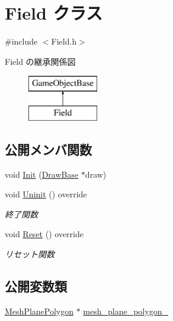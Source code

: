 \hypertarget{class_field}{}\section{Field クラス}
\label{class_field}


{\ttfamily \#include $<$Field.\+h$>$}

Field の継承関係図\begin{figure}[H]
\begin{center}
\leavevmode
\includegraphics[height=2.000000cm]{class_field}
\end{center}
\end{figure}
\subsection*{公開メンバ関数}
\begin{DoxyCompactItemize}
\item 
void \mbox{\hyperlink{class_field_a8360ab68eaf346984eab8bce4c37c3b3}{Init}} (\mbox{\hyperlink{class_draw_base}{Draw\+Base}} $\ast$draw)
\item 
void \mbox{\hyperlink{class_field_a6d1015e2409daa87cd00485ac1efc06b}{Uninit}} () override
\begin{DoxyCompactList}\small\item\em 終了関数 \end{DoxyCompactList}\item 
void \mbox{\hyperlink{class_field_a5b140074dcca821ac702da348238c6d4}{Reset}} () override
\begin{DoxyCompactList}\small\item\em リセット関数 \end{DoxyCompactList}\end{DoxyCompactItemize}
\subsection*{公開変数類}
\begin{DoxyCompactItemize}
\item 
\mbox{\hyperlink{class_mesh_plane_polygon}{Mesh\+Plane\+Polygon}} $\ast$ \mbox{\hyperlink{class_field_a5c4ad4d2fea2269e7ab2185cf09beb10}{mesh\+\_\+plane\+\_\+polygon\+\_\+}}
\end{DoxyCompactItemize}
